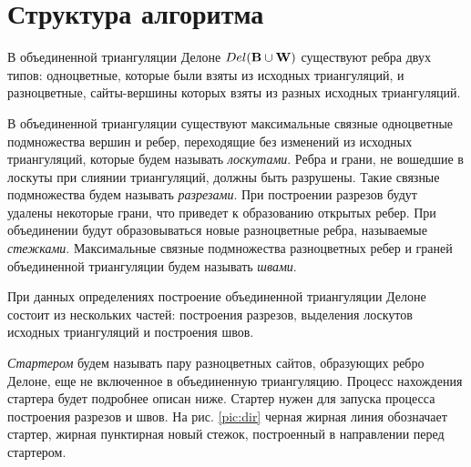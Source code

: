 \documentclass[12pt]{article}
\begin{document}
\section{Структура алгоритма}
В объединенной триангуляции Делоне $Del(\bf{B} \cup \bf{W})$ существуют ребра двух типов:
одноцветные, которые были взяты из исходных триангуляций, и разноцветные, сайты-вершины которых взяты из разных исходных триангуляций.

В объединенной триангуляции существуют максимальные связные одноцветные подмножества вершин и ребер,
переходящие без изменений из исходных триангуляций, которые будем называть {\it лоскутами}.
Ребра и грани, не вошедшие в лоскуты при слиянии триангуляций, должны быть разрушены.
Такие связные подмножества будем называть {\it разрезами}.
При построении разрезов будут удалены некоторые грани, что приведет к образованию открытых ребер.
При объединении будут образовываться новые разноцветные ребра, называемые {\it стежками}.
Максимальные связные подмножества разноцветных ребер и граней объединенной триангуляции будем называть {\it швами}.

При данных определениях построение объединенной триангуляции Делоне состоит из нескольких частей: построения разрезов,
выделения лоскутов исходных триангуляций и построения швов.

{\it Стартером} будем называть пару разноцветных сайтов, образующих ребро Делоне,
еще не включенное в объединенную триангуляцию.
Процесс нахождения стартера будет подробнее описан ниже.
Стартер нужен для запуска процесса построения разрезов и швов.
На рис. \ref{pic:dir} черная жирная линия обозначает стартер, жирная пунктирная новый стежок, построенный в направлении перед стартером.
\end{document}
